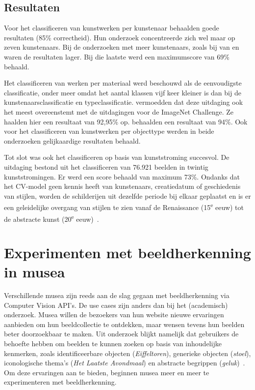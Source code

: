 \subsection{Resultaten}
\label{subsec:cv-voor-ce-resultaten}

Voor het classificeren van kunstwerken per kunstenaar behaalden \textcite{Blessings2013} goede resultaten (85\% correctheid). Hun onderzoek concentreerde zich wel maar op zeven kunstenaars. Bij de onderzoeken met meer kunstenaars, zoals bij van \textcite{Mensink2014} en \textcite{Sabatteli2018} waren de resultaten lager. Bij die laatste werd een maximumscore van 69\% behaald.

Het classificeren van werken per materiaal werd beschouwd als de eenvoudigste classificatie, onder meer omdat het aantal klassen vijf keer kleiner is dan bij de kunstenaarsclassificatie en typeclassificatie. \textcite{Sabatteli2018} vermoedden dat deze uitdaging ook het meest overeenstemt met de uitdagingen voor de ImageNet Challenge. Ze haalden hier een resultaat van 92,95\% op. \textcite{Mensink2014} behaalden een resultaat van 94\%. Ook voor het classificeren van kunstwerken per objecttype werden in beide onderzoeken gelijkaardige resultaten behaald.

Tot slot was ook het classificeren op basis van kunststroming succesvol. De uitdaging bestond uit het classificeren van 76.921 beelden in twintig kunststromingen. Er werd een score behaald van maximum 73\%. Ondanks dat het CV-model geen kennis heeft van kunstenaars, creatiedatum of geschiedenis van stijlen, worden de schilderijen uit dezelfde periode bij elkaar geplaatst en is er een geleidelijke overgang van stijlen te zien vanaf de Renaissance (15\textsuperscript{e} eeuw) tot de abstracte kunst (20\textsuperscript{e} eeuw)~\autocite{Elgammal2018}.

\newpage

\section{Experimenten met beeldherkenning in musea}
\label{sec:beeldherkenning-musea}


Verschillende musea zijn reeds aan de slag gegaan met beeldherkenning via Computer Vision API’s. De use cases zijn anders dan bij het (academisch) onderzoek. Musea willen de bezoekers van hun website nieuwe ervaringen aanbieden om hun beeldcollectie te ontdekken, maar wensen tevens hun beelden beter doorzoekbaar te maken. Uit onderzoek blijkt namelijk dat gebruikers de behoefte hebben om beelden te kunnen zoeken op basis van inhoudelijke kenmerken, zoals identificeerbare objecten (\textit{Eiffeltoren}), generieke objecten (\textit{stoel}), iconologische thema’s (\textit{Het Laatste Avondmaal}) en abstracte begrippen (\textit{geluk})~\autocite{Vanstappen2019}. Om deze ervaringen aan te bieden, beginnen musea meer en meer te experimenteren met beeldherkenning.

